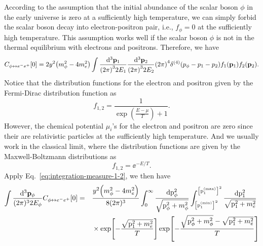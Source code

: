 \documentclass{article}
\begin{document}
        According to the assumption that the initial abundance of the scalar boson $\phi$ in the early universe is zero at a sufficiently high temperature, we can simply forbid the scalar boson decay into electron-positron pair, i.e., $f_\phi = 0$ at the sufficiently high temperature.
        This assumption works well if the scalar boson $\phi$ is not in the thermal equilibrium with electrons and positrons. 
        Therefore, we have
        \begin{equation}
            C_{\phi \leftrightarrow e^- e^+}[0] = 2 y^2 \qty(m_\phi^2 - 4 m_e^2) \int \frac{\dd[3]{\vb{p}_1}}{\qty(2 \pi)^3 2 E_1} \frac{\dd[3]{\vb{p}_2}}{\qty(2 \pi)^3 2 E_2} \qty(2 \pi)^4 \delta^{(4)}\qty(p_\phi - p_1 - p_2) f_1(\vb{p}_1) f_2(\vb{p}_2).
            \label{eq:collision-term-φee-0}
        \end{equation}
        Notice that the distribution functions for the electron and positron given by the Fermi-Dirac distribution function as
        \begin{equation}
            f_{1,2} = \frac{1}{\exp(\frac{E - \mu}{T}) + 1}.
        \end{equation}
        However, the chemical potential $\mu_i$'s for the electron and positron are zero since their are relativistic particles at the sufficiently high temperature.
        And we usually work in the classical limit, where the distribution functions are given by the Maxwell-Boltzmann distributions as
        \begin{equation}
            f_{1,2} = \ee^{-E / T}.
            \label{eq:Maxwell-Boltzmann-distribution-for-electron-and-positron}
        \end{equation}
        Apply Eq.~\eqref{eq:integration-measure-1-2}, we then have
        \begin{equation}
            \begin{aligned}
                \int \frac{\dd[3]{\vb{p}_\phi}}{(2 \pi)^3 2 E_\phi} C_{\phi \leftrightarrow e^- e^+}[0] & = && \frac{y^2 \qty(m_\phi^2 - 4 m_e^2)}{8 (2 \pi)^3} \int_0^\infty \frac{\dd{\mathrm{p}_\phi^2}}{\sqrt{\mathrm{p}_\phi^2 + m_\phi^2}} \int_{\qty[\mathrm{p}_1^\mathrm{(min)}]^2}^{\qty[\mathrm{p}_1^\mathrm{(max)}]^2} \frac{\dd{\mathrm{p}_1^2}}{\sqrt{\mathrm{p}_1^2 + m_e^2}} \\
                & && {} \times \exp[-\frac{\sqrt{\mathrm{p}_1^2 + m_e^2}}{T}] \exp[-\frac{\sqrt{\mathrm{p}_\phi^2 + m_\phi^2} - \sqrt{\mathrm{p}_1^2 + m_e^2}}{T}]
            \end{aligned}
        \end{equation}
\end{document}
